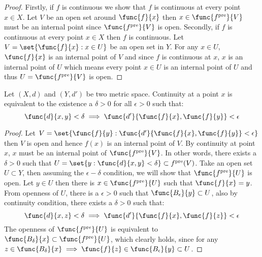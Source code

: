 \begin{proof}
    Firstly, if \(f\) is continuous we show that \(f\) is continuous at every point \(x \in X\). Let \(V\) be an open set around \( \func{f}{x}\) then \(x \in \func{f^{\mathrm{pre}}}{V}\) must be an internal point since \(\func{f^{\mathrm{pre}}}{V}\) is open.
    Secondly, if \(f\) is continuous at every point \(x \in X\) then \(f\) is continuous. Let \(V = \set{\func{f}{x} : x \in U}\) be an open set in \(Y\). For any \(x \in U\), \(\func{f}{x}\) is an internal point of \(V\) and since \(f\) is continuous at \(x\), \(x\) is an internal point of \(U\) which means every point \(x \in U\) is an internal point of \(U\) and thus \(U = \func{f^{\mathrm{pre}}}{V}\) is open.
\end{proof}

\begin{theorem} 
    Let \((X,d)\) and \((Y,d')\) be two metric space. Continuity at a point \(x\) is equivalent to the existence a \(\delta > 0\) for all \(\epsilon > 0\) such that:
    \[\func{d}{x,y} < \delta \implies \func{d'}{\func{f}{x},\func{f}{y}} < \epsilon \]
\end{theorem}

\begin{proof}
    Let \(V = \set{ \func{f}{y} :\func{d'}{\func{f}{x},\func{f}{y}} < \epsilon}\) then \(V\) is open and hence \(f(x)\) is an internal point of \(V\). By continuity at point \(x\), \(x\) must be an internal point of \(\func{f^{\mathrm{pre}}}{V}\). In other words, there exists a \(\delta > 0\) such that \(U = \set{ y : \func{d}{x,y} < \delta } \subset f^{\mathrm{pre}}(V)\).
    Take an open set \(U \subset Y\), then assuming the \(\epsilon-\delta\) condition, we will show that \(\func{f^{\mathrm{pre}}}{U}\) is open. Let \(y \in U\) then there is \(x \in \func{f^{\mathrm{pre}}}{U}\) such that \(\func{f}{x} = y\). From openness of \(U\), there is a \( \epsilon > 0\) such that \(\func{B_\epsilon}{y} \subset U\), also by continuity condition, there exists a \(\delta > 0 \) such that:
    \begin{equation*}
        \func{d}{x,z} < \delta \implies \func{d'}{\func{f}{x},\func{f}{z}} < \epsilon
    \end{equation*}
    The openness of \(\func{f^{\mathrm{pre}}}{U}\) is equivalent to \(\func{B_\delta}{x} \subset \func{f^{\mathrm{pre}}}{U}\), which clearly holds, since for any \(z \in \func{B_\delta}{x} \implies \func{f}{z} \in \func{B_\epsilon}{y} \subset U\).
\end{proof}

